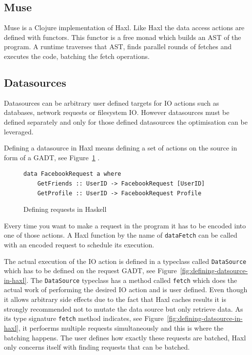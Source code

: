\subsection{Muse}

Muse\cite{Muse:repository:link} is a Clojure implementation of Haxl.
Like Haxl the data access actions are defined with functors.
This functor is a free monad which builds an AST of the program.
A runtime traverses that AST, finds parallel rounds of fetches and executes the code, batching the fetch operations.

\subsection{Datasources}

\label{subs:datasources}

Datasources can be arbitrary user defined targets for IO actions such as databases, network requests or filesystem IO.
However datasources must be defined separately and only for those defined datasources the optimisation can be leveraged.

Defining a datasource in Haxl means defining a set of actions on the source in form of a GADT\cite{PeytonJones:2006:SUT:1160074.1159811}, see Figure~\ref{fig:defining-requests-in-haxl} .

\begin{figure}
\begin{verbatim}
data FacebookRequest a where
    GetFriends :: UserID -> FacebookRequest [UserID]
    GetProfile :: UserID -> FacebookRequest Profile
\end{verbatim}
\caption{Defining requests in Haskell}
\label{fig:defining-requests-in-haxl}
\end{figure}


Every time you want to make a request in the program it has to be encoded into one of those actions.
A Haxl function by the name of \texttt{dataFetch} can be called with an encoded request to schedule its execution.

The actual execution of the IO action is defined in a typeclass called \texttt{DataSource} which has to be defined on the request GADT, see Figure~\ref{fig:defining-datsource-in-haxl}.
The \texttt{DataSource} typeclass has a method called \texttt{fetch} which does the actual work of performing the desired IO action and is user defined.
Even though it allows arbitrary side effects due to the fact that Haxl caches results it is strongly recommended not to mutate the data source but only retrieve data.
As its type signature \texttt{fetch} method indicates, see  Figure~\ref{fig:defining-datsource-in-haxl}, it perfoerms multiple requests simultaneously and this is where the batching happens.
The user defines how exactly these requests are batched, Haxl only concerns itself with finding requests that can be batched.

